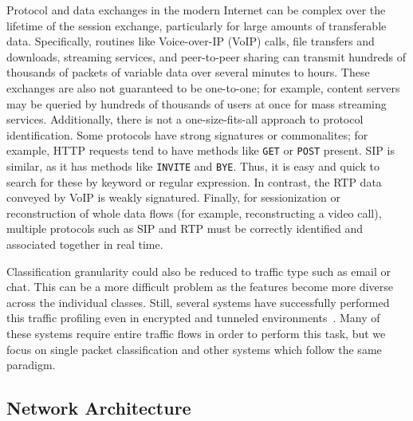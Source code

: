 Protocol and data exchanges in the modern Internet can be complex over the lifetime of the session exchange, particularly for large amounts of transferable data. Specifically, routines like Voice-over-IP (VoIP) calls, file transfers and downloads, streaming services, and peer-to-peer sharing can transmit hundreds of thousands of packets of variable data over several minutes to hours. These exchanges are also not guaranteed to be one-to-one; for example, content servers may be queried by hundreds of thousands of users at once for mass streaming services. Additionally, there is not a one-size-fits-all approach to protocol identification. Some protocols have strong signatures or commonalites; for example, HTTP requests tend to have methods like \texttt{GET} or \texttt{POST} present. SIP is similar, as it has methods like \texttt{INVITE} and \texttt{BYE}. Thus, it is easy and quick to search for these by keyword or regular expression. In contrast, the RTP data conveyed by VoIP is weakly signatured. Finally, for sessionization or reconstruction of whole data flows (for example, reconstructing a video call), multiple protocols such as SIP and RTP must be correctly identified and associated together in real time.

Classification granularity could also be reduced to traffic type such as email or chat. This can be a more difficult problem as the features become more diverse across the individual classes. Still, several systems have successfully performed this traffic profiling even in encrypted and tunneled environments~\cite{iscx-tor-paper, iscx-vpn-paper, deeppacket, didarknet}. Many of these systems require entire traffic flows in order to perform this task, but we focus on single packet classification and other systems which follow the same paradigm.

\subsection{Network Architecture}

